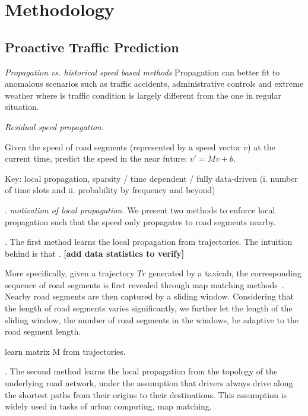 \section{Methodology}
\label{sec-method}


\subsection{Proactive Traffic Prediction}
\label{subsec-proactive}

{\em Propagation vs. historical speed based methods}
Propagation can better fit to anomalous scenarios such as traffic accidents, administrative controls and extreme weather where is traffic condition is largely different from the one in regular situation.

{\em Residual speed propagation.} 

Given the speed of road segments (represented by a speed vector $v$) at the current time, predict the speed in the near future: $v'=Mv+b$.

Key: local propagation, \ie sparsity / time dependent / fully data-driven (i. number of time slots and ii. probability by frequency and beyond)


.
{\em motivation of local propagation.}
We present two methods to enforce local propagation such that the speed only propagates to road segments nearby.

.
The first method learns the local propagation from trajectories. The intuition behind is that {\em }. {\bf [add data statistics to verify]}

More specifically, given a trajectory $Tr$ generated by a taxicab, the corresponding sequence of road segments is first revealed through map matching methods~\cite{Newson2009MM}. Nearby road segments are then captured by a sliding window. Considering that the length of road segments varies significantly, we further let the length of the sliding window, \ie the number of road segments in the windows, be adaptive to the road segment length.

\begin{example}
learn matrix M from trajectories.
\end{example}

.
The second method learns the local propagation from the topology of the underlying road network, under the assumption that drivers always drive along the shortest paths from their origins to their destinations. This assumption is widely used in tasks of urban computing, \eg map matching.

